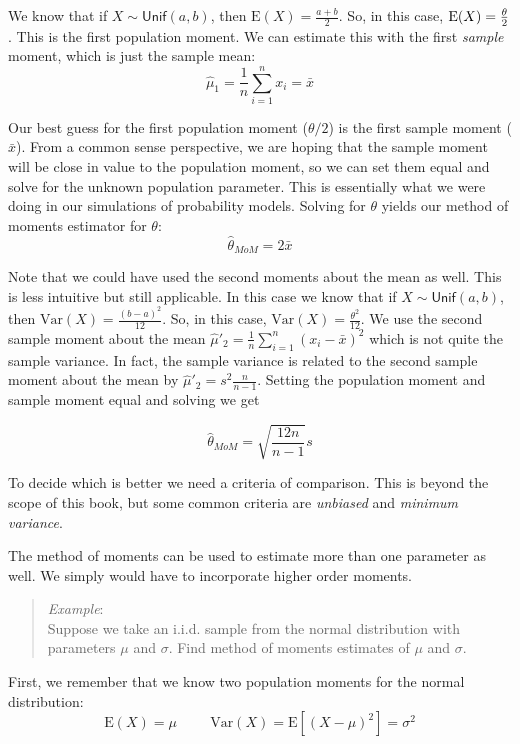 \documentclass[
  letterpaper,
  DIV=11,
  numbers=noendperiod]{scrreprt}
\begin{document}
We know that if \(X\sim \textsf{Unif}(a,b)\), then
\(\mbox{E}(X)=\frac{a+b}{2}\). So, in this case,
\(\mbox{E}(X)={\theta \over 2}\). This is the first population moment.
We can estimate this with the first \emph{sample} moment, which is just
the sample mean: \[
\hat{\mu}_1=\frac{1}{n}\sum_{i=1}^n x_i = \bar{x}
\]

Our best guess for the first population moment (\(\theta/2\)) is the
first sample moment (\(\bar{x}\)). From a common sense perspective, we
are hoping that the sample moment will be close in value to the
population moment, so we can set them equal and solve for the unknown
population parameter. This is essentially what we were doing in our
simulations of probability models. Solving for \(\theta\) yields our
method of moments estimator for \(\theta\): \[
\hat{\theta}_{MoM}=2\bar{x}
\]

Note that we could have used the second moments about the mean as well.
This is less intuitive but still applicable. In this case we know that
if \(X\sim \textsf{Unif}(a,b)\), then
\(\mbox{Var}(X)=\frac{(b - a)^2}{12}\). So, in this case,
\(\mbox{Var}(X)=\frac{\theta ^2}{ 12}\). We use the second sample moment
about the mean \(\hat{\mu}'_2=\frac{1}{n} \sum_{i=1}^n (x_i-\bar{x})^2\)
which is not quite the sample variance. In fact, the sample variance is
related to the second sample moment about the mean by
\(\hat{\mu}'_2 = s^2 \frac{n}{n-1}\). Setting the population moment and
sample moment equal and solving we get

\[
\hat{\theta}_{MoM}=\sqrt{\frac{12n}{n-1}}s
\]

To decide which is better we need a criteria of comparison. This is
beyond the scope of this book, but some common criteria are
\emph{unbiased} and \emph{minimum variance}.

The method of moments can be used to estimate more than one parameter as
well. We simply would have to incorporate higher order moments.

\begin{quote}
\emph{Example}:\\
Suppose we take an i.i.d. sample from the normal distribution with
parameters \(\mu\) and \(\sigma\). Find method of moments estimates of
\(\mu\) and \(\sigma\).
\end{quote}

First, we remember that we know two population moments for the normal
distribution: \[
\mbox{E}(X)=\mu \hspace{1cm} \mbox{Var}(X)=\mbox{E}[(X-\mu)^2]=\sigma^2
\]
\end{document}

